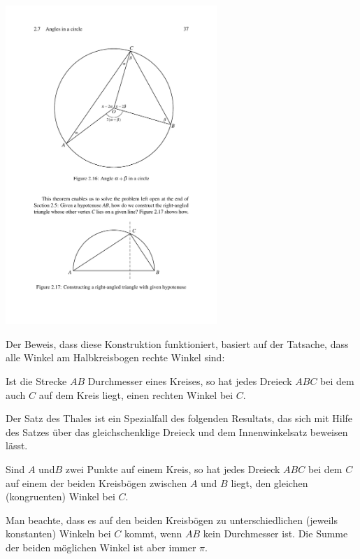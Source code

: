 \begin{center}
    \includegraphics[width=8cm]{BILDER/BildKreisUndRechtwinkligesDreieck.pdf}
\end{center}

Der Beweis, dass diese Konstruktion funktioniert, basiert auf der Tatsache, dass alle Winkel am
Halbkreisbogen rechte Winkel sind:

\begin{thm}
    Ist die Strecke $AB$ Durchmesser eines Kreises, so hat jedes Dreieck $ABC$ bei dem auch $C$ auf
    dem Kreis liegt, einen rechten Winkel bei $C$.
\end{thm}

Der Satz des Thales ist ein Spezialfall des folgenden Resultats,
das sich mit Hilfe des Satzes über das gleichschenklige Dreieck %
und dem Innenwinkelsatz beweisen lässt.

\begin{thm}
    Sind $A$ und$B$ zwei Punkte auf einem Kreis, so hat jedes Dreieck $ABC$ bei dem $C$ auf einem
    der beiden Kreisbögen zwischen $A$ und $B$ liegt, den gleichen (kongruenten) Winkel bei $C$.
\end{thm}

Man beachte, dass es auf den beiden Kreisbögen zu unterschiedlichen (jeweils konstanten) Winkeln bei
$C$ kommt, wenn $AB$ kein Durchmesser ist. Die Summe der beiden möglichen Winkel ist aber immer
$\pi$.


